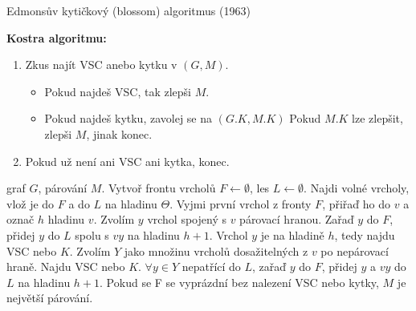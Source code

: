 \begin{algorithm}
\caption{Edmonsův kytičkový (blossom) algoritmus (1963)}
\textbf{Kostra algoritmu:}
\begin{enumerate}
  \item
  Zkus najít VSC anebo kytku v $(G,M)$. 
  \begin{itemize}
    \item Pokud najdeš VSC, tak zlepši $M$.
    \item Pokud najdeš kytku, zavolej se na $(G.K, M.K)$ Pokud $M.K$ lze zlepšit, zlepši $M$, jinak konec.
  \end{itemize}
  \item
  Pokud už není ani VSC ani kytka, konec.
\end{enumerate}

\begin{algorithmic}[1]
  \Require graf $G$, párování $M$.
  \State Vytvoř frontu vrcholů $F\gets\emptyset$, les $L\gets\emptyset$. 
  \State Najdi volné vrcholy, vlož je do $F$ a do $L$ na hladinu $\Theta$.
    \State Vyjmi první vrchol z fronty $F$, přiřaď ho do $v$ a označ $h$ hladinu $v$.
      \State Zvolím $y$ vrchol spojený s $v$ párovací hranou.
        \State Zařaď $y$ do $F$, přidej $y$ do $L$ spolu s $vy$ na hladinu $h+1$.
      \Else
        \State Vrchol $y$ je na hladině $h$, tedy najdu VSC nebo $K$.
      \EndIf
    \Else
      \State Zvolím $Y$ jako množinu vrcholů dosažitelných z $v$ po nepárovací hraně.
        \State Najdu VSC nebo $K$.
      \Else
        \State $\forall y \in Y$ nepatřící do $L$, zařaď $y$ do $F$, přidej $y$ a $vy$ do $L$ na hladinu $h+1$.
      \EndIf
    \EndIf
  \EndWhile
  \State Pokud se F se vyprázdní bez nalezení VSC nebo kytky, $M$ je největší párování.
\end{algorithmic}
\end{algorithm}
